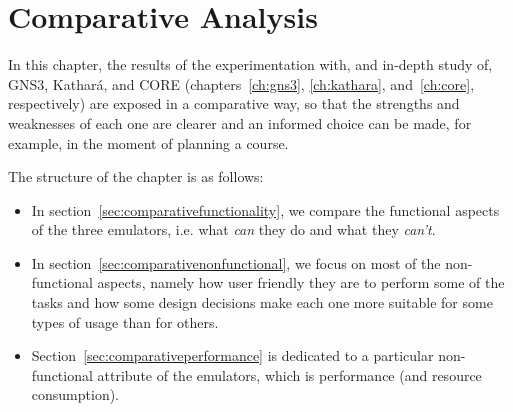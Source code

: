 
\chapter{Comparative Analysis}
\label{ch:comparative}

In this chapter, the results of the experimentation with, and in-depth study of, GNS3, Kathará, and CORE (chapters~\ref{ch:gns3}, \ref{ch:kathara}, and~\ref{ch:core}, respectively) are exposed in a comparative way, so that the strengths and weaknesses of each one are clearer and an informed choice can be made, for example, in the moment of planning a course.

The structure of the chapter is as follows:
\begin{itemize}
  \item In section~\ref{sec:comparativefunctionality}, we compare the functional aspects of the three emulators, i.e. what \emph{can} they do and what they \emph{can't}.
  \item In section~\ref{sec:comparativenonfunctional}, we focus on most of the non-functional aspects, namely how user friendly they are to perform some of the tasks and how some design decisions make each one more suitable for some types of usage than for others.
  \item Section~\ref{sec:comparativeperformance} is dedicated to a particular non-functional attribute of the emulators, which is performance (and resource consumption).
\end{itemize}









